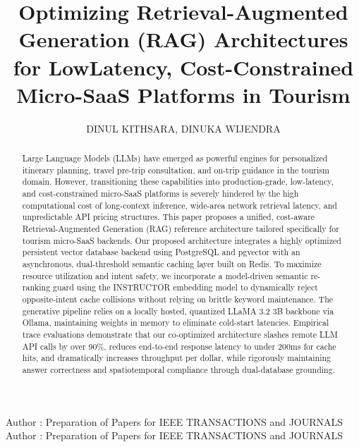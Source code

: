 \documentclass{ieeeaccess}
\begin{document}

\title{Optimizing Retrieval-Augmented Generation (RAG) Architectures for
LowLatency, Cost-Constrained Micro-SaaS Platforms in Tourism}

\author{\uppercase{Dinul Kithsara}, \uppercase{Dinuka Wijendra}}
\address[1]{Department of Information Technology, Sri Lanka Institute of Information Technology, Malabe, 10115, Sri Lanka (e-mail: info@sliit.lk)}

\markboth
{Author \headeretal: Preparation of Papers for IEEE TRANSACTIONS and JOURNALS}
{Author \headeretal: Preparation of Papers for IEEE TRANSACTIONS and JOURNALS}


\begin{abstract}
Large Language Models (LLMs) have emerged as powerful engines for personalized itinerary planning, travel pre-trip consultation, and on-trip guidance in the tourism domain. However, transitioning these capabilities into production-grade, low-latency, and cost-constrained micro-SaaS platforms is severely hindered by the high computational cost of long-context inference, wide-area network retrieval latency, and unpredictable API pricing structures. This paper proposes a unified, cost-aware Retrieval-Augmented Generation (RAG) reference architecture tailored specifically for tourism micro-SaaS backends. Our proposed architecture integrates a highly optimized persistent vector database backend using PostgreSQL and pgvector with an asynchronous, dual-threshold semantic caching layer built on Redis. To maximize resource utilization and intent safety, we incorporate a model-driven semantic re-ranking guard using the INSTRUCTOR embedding model to dynamically reject opposite-intent cache collisions without relying on brittle keyword maintenance. The generative pipeline relies on a locally hosted, quantized LLaMA 3.2 3B backbone via Ollama, maintaining weights in memory to eliminate cold-start latencies. Empirical trace evaluations demonstrate that our co-optimized architecture slashes remote LLM API calls by over 90\%, reduces end-to-end response latency to under 200ms for cache hits, and dramatically increases throughput per dollar, while rigorously maintaining answer correctness and spatiotemporal compliance through dual-database grounding.
\end{abstract}
\end{document}
